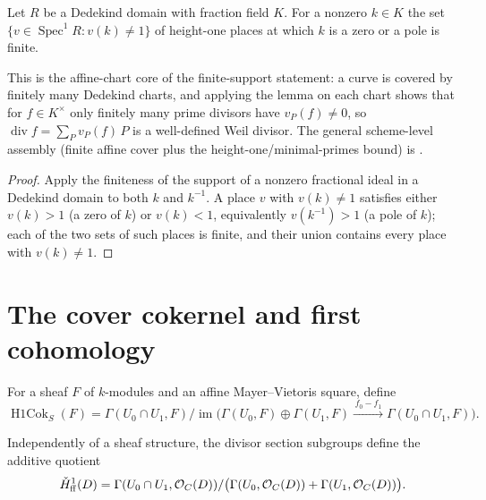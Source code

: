 \begin{lemma}
  \label{thm:adelic_finite_support_order}
  \leanok
  Let \(R\) be a Dedekind domain with fraction field \(K\). For a nonzero
  \(k \in K\) the set \(\{ v \in \operatorname{Spec}^1 R : v(k) \ne 1\}\) of
  height-one places at which \(k\) is a zero or a pole is finite.

  This is the affine-chart core of the finite-support statement: a curve is
  covered by finitely many Dedekind charts, and applying the lemma on each
  chart shows that for \(f \in K^\times\) only finitely many prime divisors
  have \(v_P(f) \ne 0\), so \(\operatorname{div} f = \sum_P v_P(f)\,P\) is a
  well-defined Weil divisor. The general scheme-level assembly (finite affine
  cover plus the height-one/minimal-primes bound) is
  .
\end{lemma}
\begin{proof}
  \leanok
  Apply the finiteness of the support of a nonzero fractional ideal in a
  Dedekind domain to both \(k\) and \(k^{-1}\). A place \(v\) with
  \(v(k) \ne 1\) satisfies either \(v(k) > 1\) (a zero of \(k\)) or
  \(v(k) < 1\), equivalently \(v(k^{-1}) > 1\) (a pole of \(k\)); each of
  the two sets of such places is finite, and their union contains every
  place with \(v(k) \ne 1\).
\end{proof}

\section{The cover cokernel and first cohomology}
\label{sec:RiemannRoch_Adelic_cokernel}

\begin{definition}
  \label{def:adelic_coverH1}
  \leanok
  For a sheaf \(F\) of \(k\)-modules and an affine Mayer--Vietoris square,
  define
  \[
    \operatorname{H1Cok}_S(F)
      =\Gamma(U_0\cap U_1,F)/
        \operatorname{im}\bigl(\Gamma(U_0,F)\oplus\Gamma(U_1,F)
          \xrightarrow{\,f_0-f_1\,}\Gamma(U_0\cap U_1,F)\bigr).
  \]
\end{definition}

\begin{definition}
  \label{def:adelic_function_field_H1}
  \leanok
  Independently of a sheaf structure, the divisor section subgroups define
  the additive quotient
  \[
    \check H^1_{\mathrm{ff}}(D)
      =\Gamma(U_0\cap U_1,\mathcal{O}_{C}(D))/
        \bigl(\Gamma(U_0,\mathcal{O}_{C}(D))+\Gamma(U_1,\mathcal{O}_{C}(D))\bigr).
  \]
\end{definition}

